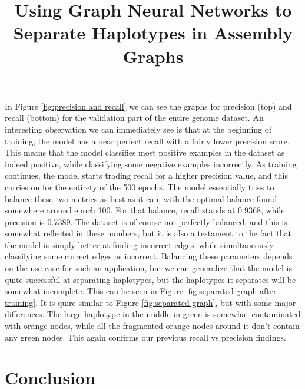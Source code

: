 \documentclass[times, utf8, diplomski, english]{fer_eng}
\begin{document}
In Figure \ref{fig:precision and recall} we can see the graphs for precision (top) and recall (bottom) for the validation part of the entire genome dataset. An interesting observation we can immediately see is that at the beginning of training, the model has a near perfect recall with a fairly lower precision score. This means that the model classifies most positive examples in the dataset as indeed positive, while classifying some negative examples incorrectly. As training continues, the model starts trading recall for a higher precision value, and this carries on for the entirety of the 500 epochs. The model essentially tries to balance these two metrics as best as it can, with the optimal balance found somewhere around epoch 100. For that balance, recall stands at 0.9368, while precision is 0.7389. The dataset is of course not perfectly balanced, and this is somewhat reflected in these numbers, but it is also a testament to the fact that the model is simply better at finding incorrect edges, while simultaneously classifying some correct edges as incorrect. Balancing these parameters depends on the use case for such an application, but we can generalize that the model is quite successful at separating haplotypes, but the haplotypes it separates will be somewhat incomplete. This can be seen in Figure \ref{fig:separated graph after training}. It is quire similar to Figure \ref{fig:separated graph}, but with some major differences. The large haplotype in the middle in green is somewhat contaminated with orange nodes, while all the fragmented orange nodes around it don't contain any green nodes. This again confirms our previous recall vs precision findings.

\chapter{Conclusion}





\clearpage

\title{Using Graph Neural Networks to Separate Haplotypes in Assembly Graphs}
\begin{abstract}

\end{abstract}

\begin{sazetak}

\end{sazetak}
\end{document}
